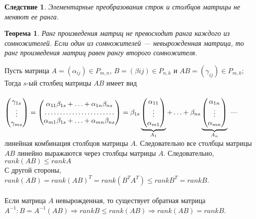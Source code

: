 \newtheorem*{cor10_7_4}{Следствие}\begin{cor10_7_4}Элементарные преобразования строк и столбцов матрицы не меняют ее ранга.
\end{cor10_7_4}
\newtheorem*{th10_7}{Теорема}\begin{th10_7}Ранг произведения матриц не превосходит ранга каждого из сомножителей. Если один из сомножителей --- невырожденная матрица, то ранг произведения матриц равен рангу второго сомножителя.
\end{th10_7}\begin{Proof}
	Пусть матрица $A = (\alpha_{ij}) \in P_{m,n}$, $B = (\beta{ij}) \in P_{n,k}$ и $AB = (\gamma_{ij}) \in P_{m,k};$ Тогда $s$-ый столбец матрицы $AB$ имеет вид\\\\
	$\begin{pmatrix} \gamma_{1s}
		\\ \vdots
		\\ \gamma_{ms}
	\end{pmatrix} = \begin{pmatrix} 
		\alpha_{11}\beta_{1s} + \ldots + \alpha_{1n}\beta_{ns}
		\\ \dotfill
		\\ \alpha_{m1}\beta_{1s} + \ldots + \alpha_{mn}\beta_{ns}
	\end{pmatrix} = \beta_{1s}\underbrace{\begin{pmatrix} \alpha_{11}
			\\ \vdots
			\\ \alpha_{m1}
	\end{pmatrix}}_{A_1} + \ldots + \beta_{ns}\underbrace{\begin{pmatrix} \alpha_{1n}
			\\ \vdots
			\\ \alpha_{mn}
	\end{pmatrix}}_{A_n}$ --- линейная комбинация столбцов матрицы $A$. Следовательно все столбцы матрицы $AB$ линейно выражаются через столбцы матрицы $A$. Следовательно, $rank(AB) \leqslant rankA$\\
	С другой стороны, $rank (AB) = rank (AB)^T = rank (B^T A^T) \leqslant rank B^T = rank B$.\\\\
	Если матрица $A$ невырожденная, то существует обратная матрица $A^{-1}: B = A^{-1} (AB)\Rightarrow rank B \leqslant rank(AB) \Rightarrow rank(AB) = rank B $.
\end{Proof}


















